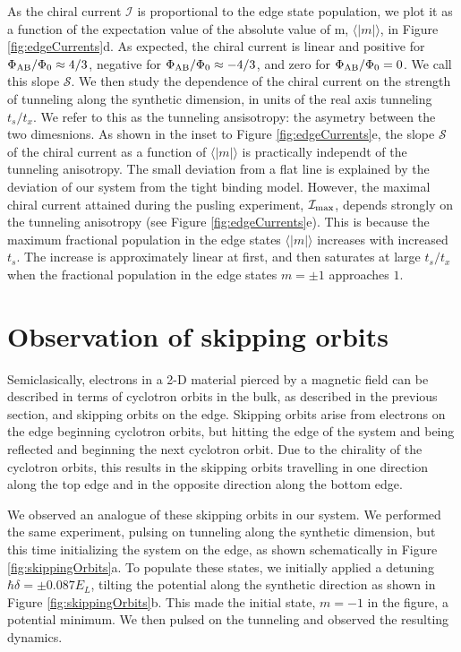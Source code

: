 As the chiral current $\mathcal{I}$ is proportional to the edge state population, we plot it as a function of the expectation value of the absolute value of m, $\langle|m|\rangle$, in Figure \ref{fig:edgeCurrents}d. As expected, the chiral current is linear and positive for $\Phi_{\rm AB}/\Phi_0\approx4/3$, negative for $\Phi_{\rm AB}/\Phi_0\approx-4/3$, and zero for $\Phi_{\rm AB}/\Phi_0=0$. We call this slope $\mathcal{S}$. We then study the dependence of the chiral current on the strength of tunneling along the synthetic dimension, in units of the real axis tunneling $t_s/t_x$. We refer to this as the tunneling ansisotropy: the asymetry between the two dimesnions. As shown in the inset to Figure \ref{fig:edgeCurrents}e, the slope $\mathcal{S}$ of the chiral current as a function of $\langle|m|\rangle$ is practically independt of the tunneling anisotropy. The small deviation from a flat line is explained by the deviation of our system from the tight binding model. However, the maximal chiral current attained during the pusling experiment, $\mathcal{I}_{\rm max}$, depends strongly on the tunneling anisotropy (see Figure \ref{fig:edgeCurrents}e). This is because the maximum fractional population in the edge states $\langle|m|\rangle$ increases with increased $t_s$. The increase is approximately linear at first, and then saturates at large $t_s/t_x$ when the fractional population in the edge states $m=\pm1$ approaches $1$.


\section{Observation of skipping orbits}

Semiclasically, electrons in a 2-D material pierced by a magnetic field can be described in terms of cyclotron orbits in the bulk, as described in the previous section, and skipping orbits on the edge. Skipping orbits arise from electrons on the edge beginning cyclotron orbits, but hitting the edge of the system and being reflected and beginning the next cyclotron orbit. Due to the chirality of the cyclotron orbits, this results in the skipping orbits travelling in one direction along the top edge and in the opposite direction along the bottom edge.   

We observed an analogue of these skipping orbits in our system. We performed the same experiment, pulsing on tunneling along the synthetic dimension, but this time initializing the system on the edge, as shown schematically in Figure \ref{fig:skippingOrbits}a. To populate these states, we initially applied a detuning $\hbar\delta=\pm0.087 E_L$, tilting the potential along the synthetic direction as shown in Figure \ref{fig:skippingOrbits}b. This made the initial state, $m=-1$ in the figure, a potential minimum. We then pulsed on the tunneling and observed the resulting dynamics. 

